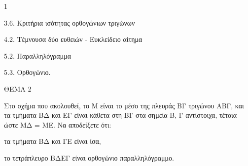 \begin{ylh}{1}
    \item 3.6. Κριτήρια ισότητας ορθογώνιων τριγώνων
    \item 4.2. Τέμνουσα δύο ευθειών - Ευκλείδειο αίτημα
    \item 5.2. Παραλληλόγραμμα
    \item 5.3. Ορθογώνιο.
\end{ylh}

ΘΕΜΑ 2

Στο σχήμα που ακολουθεί, το Μ είναι το μέσο της πλευράς ΒΓ τριγώνου ΑΒΓ, και τα τμήματα ΒΔ και ΕΓ είναι κάθετα στη ΒΓ στα σημεία Β, Γ αντίστοιχα, τέτοια ώστε ΜΔ = ΜΕ. Να αποδείξετε ότι:

\begin{alist}
\item τα τμήματα ΒΔ και ΓΕ είναι ίσα, 

\item το τετράπλευρο ΒΔΕΓ είναι ορθογώνιο παραλληλόγραμμο. 


\begin{center}
\end{center}
\end{alist}
